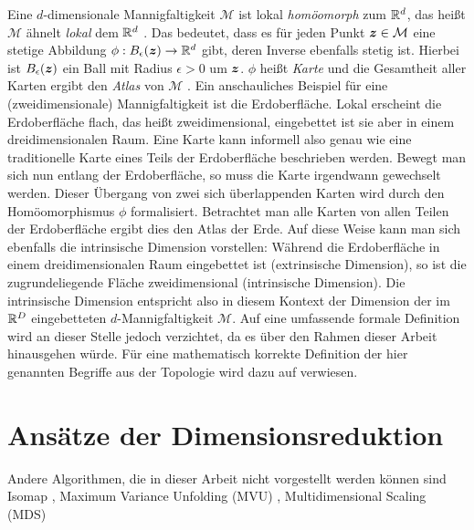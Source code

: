Eine $d$-dimensionale Mannigfaltigkeit $\mathcal{M}$ ist lokal \textit{homöomorph} zum $\mathbb{R}^d$,
das heißt $\mathcal{M}$ ähnelt \textit{lokal} dem $\mathbb{R}^d$ \parencite[3]{Lee.2011}. Das bedeutet, dass es für jeden Punkt $\bm{z} \in \mathcal{M}$ eine stetige
Abbildung $\phi: B_\epsilon(\bm{z}) \rightarrow \mathbb{R}^d$ gibt, deren Inverse ebenfalls stetig
ist. Hierbei ist $B_\epsilon(\bm{z})$ ein Ball mit Radius $\epsilon > 0$ um $\bm{z}$. $\phi$
heißt \textit{Karte} und die Gesamtheit aller Karten ergibt den \textit{Atlas} von $\mathcal{M}$ \parencite[4]{Cayton.2005}. Ein anschauliches Beispiel für eine (zweidimensionale) Mannigfaltigkeit ist
die Erdoberfläche. Lokal erscheint die Erdoberfläche flach, das heißt zweidimensional, eingebettet
ist sie aber in einem dreidimensionalen Raum. Eine Karte kann informell also genau wie eine
traditionelle Karte eines Teils der Erdoberfläche beschrieben werden. Bewegt man sich nun entlang
der Erdoberfläche, so muss die Karte irgendwann gewechselt werden. Dieser Übergang von zwei sich
überlappenden Karten wird durch den Homöomorphismus $\phi$ formalisiert. Betrachtet man alle Karten
von allen Teilen der Erdoberfläche ergibt dies den Atlas der Erde. Auf diese Weise kann man sich
ebenfalls die intrinsische Dimension vorstellen: Während die Erdoberfläche in einem
dreidimensionalen Raum eingebettet ist (extrinsische Dimension), so ist die zugrundeliegende Fläche
zweidimensional (intrinsische Dimension). Die intrinsische Dimension entspricht also in diesem
Kontext der Dimension der im $\mathbb{R}^D$ eingebetteten $d$-Mannigfaltigkeit $\mathcal{M}$. Auf eine
umfassende formale Definition wird an dieser Stelle jedoch verzichtet, da es über den Rahmen dieser
Arbeit hinausgehen würde. Für eine mathematisch korrekte Definition der hier genannten Begriffe aus
der Topologie wird dazu auf \textcites{Lee.2011}{Lee.2012} verwiesen.

\section{Ansätze der Dimensionsreduktion}
\label{ch:Dimensionsreduktion:Ansaetze}

Andere Algorithmen, die in dieser Arbeit nicht vorgestellt werden können sind Isomap \parencite{Tenenbaum.2000}, Maximum Variance Unfolding (MVU) \parencite{Weinberger.2006}, Multidimensional Scaling (MDS) \parencites{Kruskal.1964}{Cox.2008}

